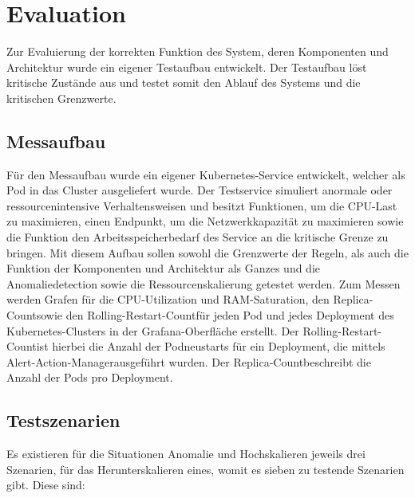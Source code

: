 \documentclass[a4paper,10pt]{scrartcl}
\begin{document}
\pagebreak
\section{Evaluation}

Zur Evaluierung der korrekten Funktion des System, deren Komponenten und Architektur wurde ein eigener Testaufbau entwickelt. Der Testaufbau löst kritische Zustände aus und testet somit den Ablauf des Systems und die kritischen Grenzwerte.

\subsection{Messaufbau}

Für den Messaufbau wurde ein eigener Kubernetes-Service entwickelt, welcher als Pod in das Cluster ausgeliefert wurde. Der Testservice simuliert anormale oder ressourcenintensive Verhaltensweisen und besitzt Funktionen, um die CPU-Last zu maximieren, einen Endpunkt, um die Netzwerkkapazität zu maximieren sowie die Funktion den Arbeitsspeicherbedarf des Service an die kritische Grenze zu bringen.
Mit diesem Aufbau sollen sowohl die Grenzwerte der Regeln, als auch die Funktion der Komponenten und Architektur als Ganzes und die Anomaliedetection sowie die Ressourcenskalierung getestet werden.
Zum Messen werden Grafen für die CPU-Utilization und RAM-Saturation, den \glqq Replica-Count\grqq sowie den \glqq Rolling-Restart-Count\grqq für jeden Pod und jedes Deployment des Kubernetes-Clusters in der Grafana-Oberfläche erstellt. Der \glqq Rolling-Restart-Count\grqq ist hierbei die Anzahl der Podneustarts für ein Deployment, die mittels \glqq Alert-Action-Manager\grqq ausgeführt wurden. Der \glqq Replica-Count\grqq beschreibt die Anzahl der Pods pro Deployment.

\subsection{Testszenarien}

Es existieren für die Situationen Anomalie und Hochskalieren jeweils drei Szenarien, für das Herunterskalieren eines, womit es sieben zu testende Szenarien gibt.
Diese sind:
\end{document}
